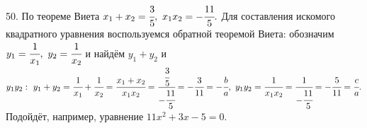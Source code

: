 50. По теореме Виета $x_1+x_2=\cfrac{3}{5},\ x_1x_2=-\cfrac{11}{5}.$ Для составления искомого квадратного уравнения воспользуемся обратной теоремой Виета: обозначим $y_1=\cfrac{1}{x_1},\ y_2=\cfrac{1}{x_2}$ и найдём $y_1+y_2$ и $y_1y_2:\ y_1+y_2=\cfrac{1}{x_1}+\cfrac{1}{x_2}=
\cfrac{x_1+x_2}{x_1x_2}=\cfrac{\cfrac{3}{5}}{-\cfrac{11}{5}}=-\cfrac{3}{11}=-\cfrac{b}{a},\ y_1y_2=\cfrac{1}{x_1x_2}=\cfrac{1}{-\cfrac{11}{5}}=-\cfrac{5}{11}=\cfrac{c}{a}.$ Подойдёт, например, уравнение $11x^2+3x-5=0.$\\
